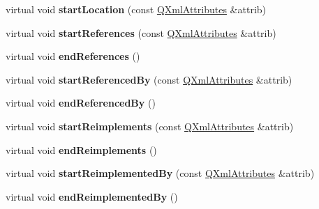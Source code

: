 \begin{DoxyCompactItemize}
\item 
\hypertarget{class_member_handler_a588050483d3f93dc2854f3abdbdbfa4f}{virtual void {\bfseries start\-Location} (const \hyperlink{class_q_xml_attributes}{Q\-Xml\-Attributes} \&attrib)}\label{class_member_handler_a588050483d3f93dc2854f3abdbdbfa4f}

\item 
\hypertarget{class_member_handler_abe7c1aac16eaff3100c51452f57da3b3}{virtual void {\bfseries start\-References} (const \hyperlink{class_q_xml_attributes}{Q\-Xml\-Attributes} \&attrib)}\label{class_member_handler_abe7c1aac16eaff3100c51452f57da3b3}

\item 
\hypertarget{class_member_handler_ab2fa42532cb79e84acf4d811be505d95}{virtual void {\bfseries end\-References} ()}\label{class_member_handler_ab2fa42532cb79e84acf4d811be505d95}

\item 
\hypertarget{class_member_handler_a69998add0bb3e4f16f17b3327f4f5aa3}{virtual void {\bfseries start\-Referenced\-By} (const \hyperlink{class_q_xml_attributes}{Q\-Xml\-Attributes} \&attrib)}\label{class_member_handler_a69998add0bb3e4f16f17b3327f4f5aa3}

\item 
\hypertarget{class_member_handler_afaabe5a8c9cc30a475d2b36fc28567c6}{virtual void {\bfseries end\-Referenced\-By} ()}\label{class_member_handler_afaabe5a8c9cc30a475d2b36fc28567c6}

\item 
\hypertarget{class_member_handler_aedc0fddad2e2192995d55d2a759cbc2c}{virtual void {\bfseries start\-Reimplements} (const \hyperlink{class_q_xml_attributes}{Q\-Xml\-Attributes} \&attrib)}\label{class_member_handler_aedc0fddad2e2192995d55d2a759cbc2c}

\item 
\hypertarget{class_member_handler_a96e3939c1ac1297fba2df9d8624d16a2}{virtual void {\bfseries end\-Reimplements} ()}\label{class_member_handler_a96e3939c1ac1297fba2df9d8624d16a2}

\item 
\hypertarget{class_member_handler_a245d139399a694cadcf551b92e4c2c65}{virtual void {\bfseries start\-Reimplemented\-By} (const \hyperlink{class_q_xml_attributes}{Q\-Xml\-Attributes} \&attrib)}\label{class_member_handler_a245d139399a694cadcf551b92e4c2c65}

\item 
\hypertarget{class_member_handler_a775ccd3b12307249500b23c0bdb29eee}{virtual void {\bfseries end\-Reimplemented\-By} ()}\label{class_member_handler_a775ccd3b12307249500b23c0bdb29eee}


\end{DoxyCompactItemize}
